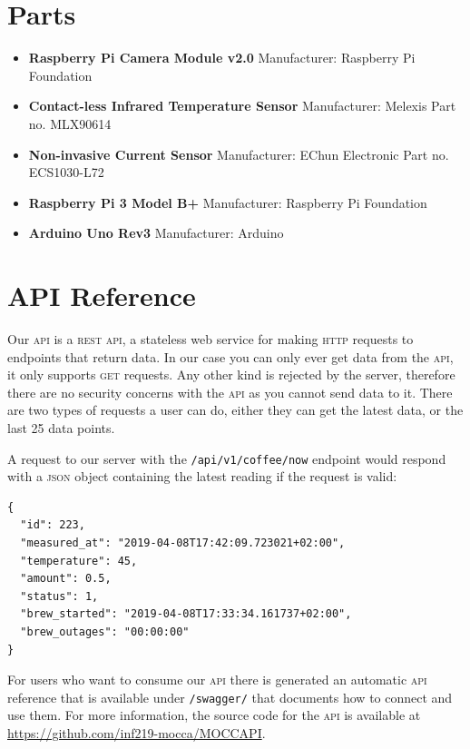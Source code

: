 \documentclass[12pt,a4paper,oneside,article]{memoir}
\numberwithin{equation}{chapter}
\begin{document}
\chapter{Parts}\label{sec:parts}
\begin{itemize}
\item \textbf{Raspberry Pi Camera Module v2.0} \newline
Manufacturer: Raspberry Pi Foundation

\item \textbf{Contact-less Infrared Temperature Sensor} \newline
Manufacturer: Melexis \newline
Part no. MLX90614

\item \textbf{Non-invasive Current Sensor} \newline
Manufacturer: EChun Electronic \newline
Part no. ECS1030-L72

\item \textbf{Raspberry Pi 3 Model B+} \newline
Manufacturer: Raspberry Pi Foundation 

\item \textbf{Arduino Uno Rev3} \newline
Manufacturer: Arduino

\end{itemize}

\chapter{API Reference}\label{sec:api-reference}
Our \textsc{api} is a \textsc{rest api}, a stateless web service for making
\textsc{http} requests to endpoints that return data. In our case you can only
ever get data from the \textsc{api}, it only supports \textsc{get} requests. Any
other kind is rejected by the server, therefore there are no security concerns
with the \textsc{api} as you cannot send data to it. There are two types of
requests a user can do, either they can get the latest data, or the last 25 data
points.

A request to our server with the \lstinline{/api/v1/coffee/now} endpoint would
respond with a \textsc{json} object containing the latest reading if the request
is valid:

\begin{lstlisting}
{
  "id": 223,
  "measured_at": "2019-04-08T17:42:09.723021+02:00",
  "temperature": 45,
  "amount": 0.5,
  "status": 1,
  "brew_started": "2019-04-08T17:33:34.161737+02:00",
  "brew_outages": "00:00:00"
}
\end{lstlisting}

For users who want to consume our \textsc{api} there is generated an automatic
\textsc{api} reference that is available under \lstinline{/swagger/} that
documents how to connect and use them. For more information, the source code for
the \textsc{api} is available at
{\small\url{https://github.com/inf219-mocca/MOCCAPI}}.

\clearpage{}
\renewcommand*{\UrlFont}{\footnotesize\ttfamily}
\printbibliography{}
\end{document}
